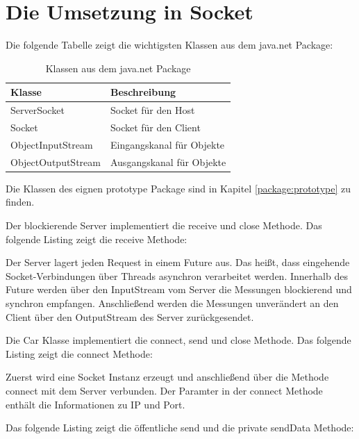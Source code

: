 \section{Die Umsetzung in Socket}
Die folgende Tabelle zeigt die wichtigsten Klassen aus dem java.net Package:
\begin{table}[H]
\centering
\caption{Klassen aus dem java.net Package}
\begin{tabular}{|l|l|}
\hline
\rowcolor[HTML]{00A99D} 
{\color[HTML]{FFFFFF} Klasse} & {\color[HTML]{FFFFFF} Beschreibung} \\ \hline
ServerSocket & Socket für den Host \\ \hline
Socket & Socket für den Client \\ \hline
ObjectInputStream & Eingangskanal für Objekte \\ \hline
ObjectOutputStream & Ausgangskanal für Objekte \\ \hline
\end{tabular}
\end{table}

Die Klassen des eignen prototype Package sind in Kapitel \ref{package:prototype} zu finden.

Der blockierende Server implementiert die receive und close Methode. Das folgende Listing zeigt die receive Methode: 
\clearpage


Der Server lagert jeden Request in einem Future aus. Das heißt, dass eingehende Socket-Verbindungen über Threads asynchron verarbeitet werden. Innerhalb des Future werden über den InputStream vom Server die Messungen blockierend und synchron empfangen. Anschließend werden die Messungen unverändert an den Client über den OutputStream des Server zurückgesendet.

Die Car Klasse implementiert die connect, send und close Methode. Das folgende Listing zeigt die connect Methode:



Zuerst wird eine Socket Instanz erzeugt und anschließend über die Methode connect mit dem Server verbunden. Der Paramter in der connect Methode enthält die Informationen zu IP und Port.

Das folgende Listing zeigt die öffentliche send und die private sendData Methode:

